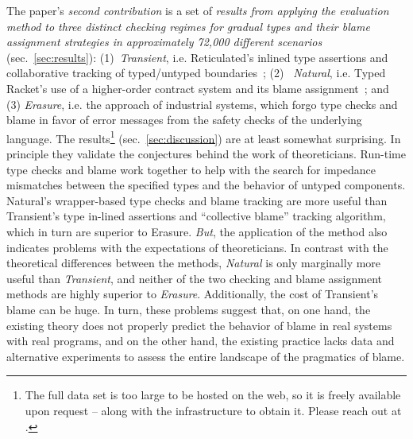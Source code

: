 The paper's {\it second contribution\/} is a set of {\em results from
applying the evaluation method to three distinct checking regimes for
gradual types and their blame assignment
strategies in approximately 72,000 different scenarios\/}
(sec.~\ref{sec:results}): (1)~{\it Transient\/}, i.e. Reticulated's
inlined type assertions and collaborative tracking of typed/untyped boundaries~\citep{vss-popl-2017}; (2)~{\it
Natural\/}, i.e. Typed Racket's use of a higher-order contract system and
its blame assignment~\citep{ff-icfp-2002}; and (3) {\it Erasure\/}, i.e.
the approach of industrial systems, which forgo type checks and blame in favor of error
messages from the safety checks of the underlying language. The results\footnote{The full data set is too large to be hosted on the web, so it is freely available upon request -- along with the infrastructure to obtain it. Please reach out at .}
(sec.~\ref{sec:discussion}) are at least somewhat surprising.  In
principle they validate the conjectures behind the work of theoreticians.
Run-time type checks and blame work together to help with the search for
impedance mismatches between the specified types and the behavior of
untyped components.  Natural's wrapper-based type checks and blame tracking are
more useful than Transient's type in-lined assertions and ``collective blame'' tracking algorithm,
which in turn are superior to Erasure. {\em But\/}, the application of the
method also indicates problems with the expectations of theoreticians. 
In contrast with the theoretical differences between the methods,
{\it Natural\/} is only marginally more useful than {\it Transient\/}, and neither of the two
checking and blame assignment methods are highly superior to {\it Erasure\/}. Additionally, 
the cost of Transient's blame can be huge.  In turn, these
problems suggest that, on one hand, the existing theory does not properly
predict the behavior of blame in real systems with real programs,
and on the other hand, the existing practice lacks data and alternative
experiments to assess the entire landscape of the pragmatics of blame. 
